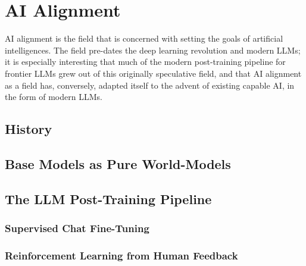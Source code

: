 \chapter{AI Alignment}\label{ch_ai_alignment}

AI alignment is the field that is concerned with setting the goals of
artificial intelligences. The field pre-dates the deep learning revolution and
modern LLMs; it is especially interesting that much of the modern post-training
pipeline for frontier LLMs grew out of this originally speculative field, and
that AI alignment as a field has, conversely, adapted itself to the advent of
existing capable AI, in the form of modern LLMs.

\section{History}
\cite{bostrom2014superintelligence}

\section{Base Models as Pure World-Models}

\section{The LLM Post-Training Pipeline}

\subsection{Supervised Chat Fine-Tuning}

\subsection{Reinforcement Learning from Human Feedback}

